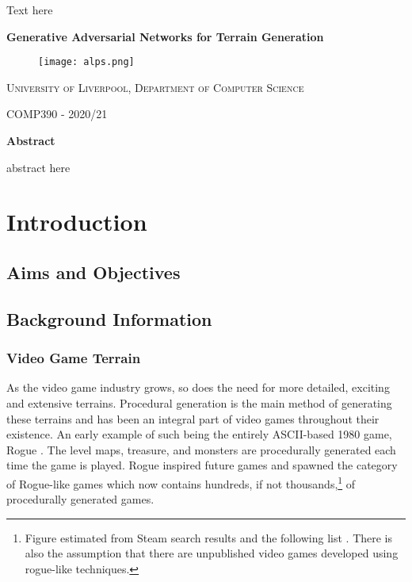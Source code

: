 \documentclass[a4paper]{report}
\begin{document}

Text here
\newpage
\begin{center}

\textbf{\Large Generative Adversarial Networks for Terrain Generation}
\vspace{2em}
\end{center}

\begin{figure}[H]
    \centering
        \texttt{[image: alps.png]}
        \label{fig:title}
\end{figure}

\begin{center}
    \textsc{University of Liverpool, Department of Computer Science}
\end{center}
\begin{center}
    \textsc{COMP390 - 2020/21}
\end{center}

\textbf{Abstract}

abstract here

\newpage
\tableofcontents
\newpage
\section{Introduction}
\subsection{Aims and Objectives}
\subsection{Background Information}
\subsubsection{Video Game Terrain}
As the video game industry grows, so does the need for more detailed, exciting and extensive terrains. Procedural generation is the main method of generating these terrains and has been an integral part of video games throughout their existence. An early example of such being the entirely ASCII-based 1980 game, Rogue \cite{rogue}. The level maps, treasure, and monsters are procedurally generated each time the game is played. Rogue inspired future games and spawned the category of Rogue-like games which now contains hundreds, if not thousands,\footnote{Figure estimated from Steam search results \cite{roguelikeSteam} and the following list \cite{roguebasin_2020}. There is also the assumption that there are unpublished video games developed using rogue-like techniques.} of procedurally generated games.
\end{document}
